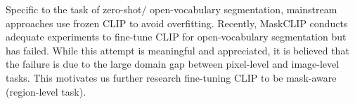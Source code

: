 Specific to the task of zero-shot/ open-vocabulary segmentation, mainstream approaches use frozen CLIP to avoid overfitting. Recently, MaskCLIP \cite{zhou2022extract} conducts adequate experiments to fine-tune CLIP for open-vocabulary segmentation but has failed. While this attempt is meaningful and appreciated,  it is believed that the failure is due to the large domain gap between pixel-level and image-level tasks. 
This motivates us further research fine-tuning CLIP to be mask-aware (region-level task).

